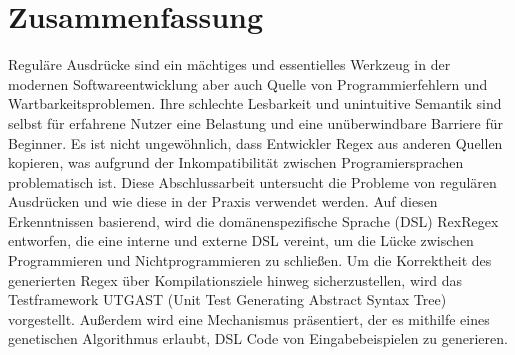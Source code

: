 \section*{Zusammenfassung}

Reguläre Ausdrücke sind ein mächtiges und essentielles Werkzeug in der modernen Softwareentwicklung aber auch Quelle von Programmierfehlern und Wartbarkeitsproblemen. Ihre schlechte Lesbarkeit und unintuitive Semantik sind selbst für erfahrene Nutzer eine Belastung und eine unüberwindbare Barriere für Beginner. Es ist nicht ungewöhnlich, dass Entwickler Regex aus anderen Quellen kopieren, was aufgrund der Inkompatibilität zwischen Programiersprachen problematisch ist. Diese Abschlussarbeit untersucht die Probleme von regulären Ausdrücken und wie diese in der Praxis verwendet werden. Auf diesen Erkenntnissen basierend, wird die domänenspezifische Sprache (DSL) RexRegex entworfen, die eine interne und externe DSL vereint, um die Lücke zwischen Programmieren und Nichtprogrammieren zu schließen. Um die Korrektheit des generierten Regex über Kompilationsziele hinweg sicherzustellen, wird das Testframework UTGAST (Unit Test Generating Abstract Syntax Tree) vorgestellt. Außerdem wird eine Mechanismus präsentiert, der es mithilfe eines genetischen Algorithmus erlaubt, DSL Code von Eingabebeispielen zu generieren.
